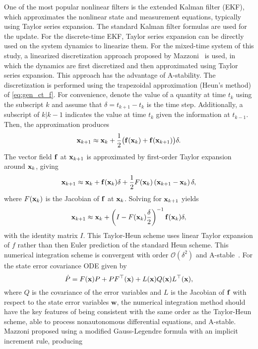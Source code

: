 \documentclass[../zhang_thesis.tex]{subfiles}
\begin{document}
One of the most popular nonlinear filters is the extended Kalman filter (EKF), which approximates the nonlinear state and measurement equations, typically using Taylor series expansion. The standard Kalman filter formulas are used for the update. For the discrete-time EKF, Taylor series expansion can be directly used on the system dynamics to linearize them. For the mixed-time system of this study, a linearized discretization approach proposed by Mazzoni~\cite{mazzoni07} is used, in
which the dynamics are first discretized and then approximated using Taylor series expansion. This approach has the advantage of A-stability. The discretization is performed using the trapezoidal approximation (Heun's method) of \autoref{eq:gen_ct_f}. For convenience, denote the value of a quantity at time $t_k$ using the subscript $k$ and assume that $\delta=t_{k+1}-t_k$ is the time step. Additionally, a subscript of $k|k-1$ indicates the value at time $t_k$ given the information at
$t_{k-1}$. Then, the approximation produces
\begin{equation}
    \mathbf{x}_{k+1} \approx \mathbf{x}_k + \frac{1}{2} \big( \mathbf{f}(\mathbf{x}_k) + \mathbf{f}(\mathbf{x}_{k+1}) \big) \delta.
\end{equation}
The vector field $\mathbf{f}$ at $\mathbf{x}_{k+1}$ is approximated by first-order Taylor expansion around $\mathbf{x}_k$, giving
\begin{equation}
    \mathbf{x}_{k+1} \approx \mathbf{x}_k + \mathbf{f}(\mathbf{x}_k)\delta + \frac{1}{2} F(\mathbf{x}_k) \left( \mathbf{x}_{k+1} - \mathbf{x}_k \right) \delta,
\end{equation}
where $F(\mathbf{x}_k)$ is the Jacobian of $\mathbf{f}$ at $\mathbf{x}_k$. Solving for $\mathbf{x}_{k+1}$ yields
\begin{equation}
    \mathbf{x}_{k+1} \approx \mathbf{x}_k + \left( I - F(\mathbf{x}_k) \frac{\delta}{2} \right)^{-1} \mathbf{f}(\mathbf{x}_k) \delta,
\end{equation}
with the identity matrix $I$. This Taylor-Heun scheme uses linear Taylor expansion of $f$ rather than then Euler prediction of the standard Heun scheme. This numerical integration scheme is convergent with order $\mathcal{O}(\delta^2)$ and A-stable~\cite{mazzoni07}. For the state error covariance ODE given by
\begin{equation}
    \dot{P} = F(\mathbf{x}) P + P F^\top(\mathbf{x}) + L(\mathbf{x}) Q(\mathbf{x}) L^\top(\mathbf{x}),
\end{equation}
where $Q$ is the covariance of the error variables and $L$ is the Jacobian of $\mathbf{f}$ with respect to the state error variables $\mathbf{w}$, the numerical integration method should have the key features of being consistent with the same order as the Taylor-Heun scheme, able to process nonautonomous differential equations, and A-stable. Mazzoni proposed using a modified Gauss-Legendre formula with an implicit increment rule, producing
\end{document}
